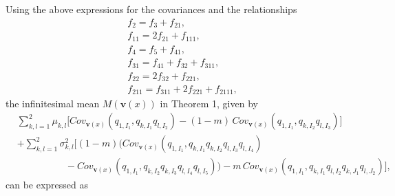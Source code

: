 \documentclass[11pt]{article}
\begin{document}
Using the above expressions for the covariances and the relationships
\begin{subequations}\label{AA-eq6}
\begin{align}
&f_{2}=f_{3}+f_{21},\\
&f_{11}=2f_{21}+f_{111},\\
&f_{4}=f_{5}+f_{41},\\
&f_{31}=f_{41}+f_{32}+f_{311},\\
&f_{22}=2f_{32}+f_{221},\\
&f_{211}=f_{311}+2f_{221}+f_{2111},
\end{align}
\end{subequations}
the infinitesimal mean $M(\mathbf{v}(x))$ in Theorem 1, given by 
\begin{align}\label{}
&\sum_{k,l=1}^{2}\mu_{k,l}\Big[Cov_{\mathbf{v}(x)}\left(q_{1,I_1},q_{k,I_1}q_{l,I_2}\right)-(1-m)\, Cov_{\mathbf{v}(x)}\left(q_{1,I_1},q_{k,I_2}q_{l,I_3}\right)\Big]\nonumber
\\
&+\sum_{k,l=1}^{2}\sigma^2_{k,l}\Big[
(1-m)\Big(Cov_{\mathbf{v}(x)}\left(q_{1,I_1},q_{k,I_1}q_{k,I_2}q_{l,I_3}q_{l,I_4}\right)\nonumber\\
&\quad\quad\quad\quad\quad-Cov_{\mathbf{v}(x)}\left(q_{1,I_1},q_{k,I_2}q_{k,I_3}q_{l,I_4}q_{l,I_5}\right)\Big)-m\,  Cov_{\mathbf{v}(x)}\left(q_{1,I_1},q_{k,I_1}q_{l,I_2}q_{k,J_1}q_{l,J_2}\right)
\Big],
\end{align}
can be expressed as 
\end{document}
